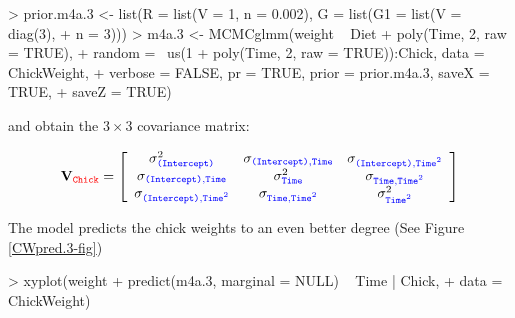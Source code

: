 \documentclass{article}
\begin{document}
\begin{Schunk}
\begin{Sinput}
> prior.m4a.3 <- list(R = list(V = 1, n = 0.002), G = list(G1 = list(V = diag(3), 
+     n = 3)))
> m4a.3 <- MCMCglmm(weight ~ Diet + poly(Time, 2, raw = TRUE), 
+     random = ~us(1 + poly(Time, 2, raw = TRUE)):Chick, data = ChickWeight, 
+     verbose = FALSE, pr = TRUE, prior = prior.m4a.3, saveX = TRUE, 
+     saveZ = TRUE)
\end{Sinput}
\end{Schunk}

and obtain the $3\times3$ covariance matrix:

\begin{displaymath}
{\bf V}_{{\color{red} \texttt{Chick}}}=
\left[
\begin{array}{ccc}
\sigma^{2}_{\color{blue}\texttt{(Intercept)}}&\sigma_{\color{blue}\texttt{(Intercept)}, \texttt{Time}}&\sigma_{\color{blue}\texttt{(Intercept)}, \texttt{Time$^{2}$}}\\
\sigma_{\color{blue}\texttt{(Intercept)}, \texttt{Time}}&\sigma^{2}_{\color{blue} \texttt{Time}}&\sigma_{\color{blue}\texttt{Time}, \texttt{Time$^{2}$}}\\
\sigma_{\color{blue}\texttt{(Intercept)}, \texttt{Time$^2$}}&\sigma_{\color{blue}\texttt{Time}, \texttt{Time$^{2}$}}&\sigma^{2}_{\color{blue} \texttt{Time$^2$}}\\
\end{array}
\right]
\end{displaymath}

The model predicts the chick weights to an even better degree  (See Figure \ref{CWpred.3-fig})

\begin{Schunk}
\begin{Sinput}
> xyplot(weight + predict(m4a.3, marginal = NULL) ~ Time | Chick, 
+     data = ChickWeight)
\end{Sinput}
\end{Schunk}
\end{document}
